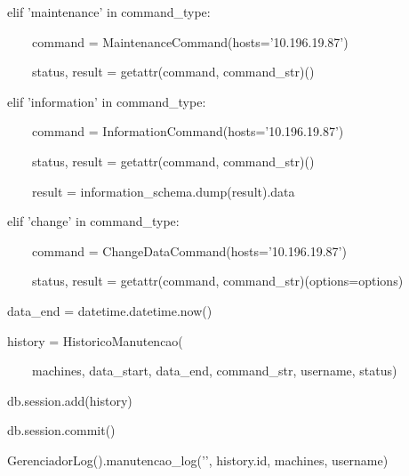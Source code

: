 {\ttfamily\color[rgb]{0.10980392,0.10980392,0.10980392}
    \ \ \ \ elif 'maintenance' in command\_type:}

{\ttfamily\color[rgb]{0.10980392,0.10980392,0.10980392}
    \ \ \ \ \ \ \ \ command = MaintenanceCommand(hosts='10.196.19.87')}

{\ttfamily\color[rgb]{0.10980392,0.10980392,0.10980392}
    \ \ \ \ \ \ \ \ status, result = getattr(command, command\_str)()}

{\ttfamily\color[rgb]{0.10980392,0.10980392,0.10980392}
    \ \ \ \ elif 'information' in command\_type:}

{\ttfamily\color[rgb]{0.10980392,0.10980392,0.10980392}
    \ \ \ \ \ \ \ \ command = InformationCommand(hosts='10.196.19.87')}

{\ttfamily\color[rgb]{0.10980392,0.10980392,0.10980392}
    \ \ \ \ \ \ \ \ status, result = getattr(command, command\_str)()}

{\ttfamily\color[rgb]{0.10980392,0.10980392,0.10980392}
    \ \ \ \ \ \ \ \ result = information\_schema.dump(result).data}

{\ttfamily\color[rgb]{0.10980392,0.10980392,0.10980392}
    \ \ \ \ elif 'change' in command\_type:}

{\ttfamily\color[rgb]{0.10980392,0.10980392,0.10980392}
    \ \ \ \ \ \ \ \ command = ChangeDataCommand(hosts='10.196.19.87')}

{\ttfamily\color[rgb]{0.10980392,0.10980392,0.10980392}
    \ \ \ \ \ \ \ \ status, result = getattr(command, command\_str)(options=options)}


    \bigskip

{\ttfamily\color[rgb]{0.10980392,0.10980392,0.10980392}
    \ \ \ \ data\_end = datetime.datetime.now()}


    \bigskip

{\ttfamily\color[rgb]{0.10980392,0.10980392,0.10980392}
    \ \ \ \ history = HistoricoManutencao(}

            {\ttfamily\color[rgb]{0.10980392,0.10980392,0.10980392}
            \ \ \ \ \ \ \ \ machines, data\_start, data\_end, command\_str, username, status)}

{\ttfamily\color[rgb]{0.10980392,0.10980392,0.10980392}
    \ \ \ \ db.session.add(history)}

{\ttfamily\color[rgb]{0.10980392,0.10980392,0.10980392}
    \ \ \ \ db.session.commit()}


    \bigskip

{\ttfamily\color[rgb]{0.10980392,0.10980392,0.10980392}
    \ \ \ \ GerenciadorLog().manutencao\_log('{}', history.id, machines, username)}

